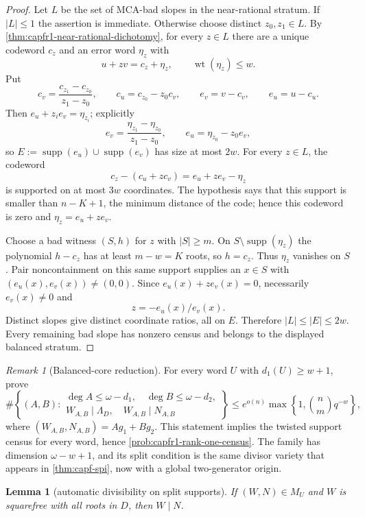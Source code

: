 \documentclass[11pt]{article}
\newtheorem{lemma}[lemma]{Lemma}
\theoremstyle{definition}
\theoremstyle{remark}
\newtheorem{remark}[remark]{Remark}
\providecommand{\wt}{\operatorname{wt}}
\begin{document}
\begin{proof}
Let $L$ be the set of MCA-bad slopes in the near-rational stratum.  If
$|L|\le1$ the assertion is immediate.  Otherwise choose distinct
$z_0,z_1\in L$.  By \cref{thm:capfr1-near-rational-dichotomy}, for every
$z\in L$ there are a unique codeword $c_z$ and an error word $\eta_z$ with
\[
        u+zv=c_z+\eta_z,
        \qquad \wt(\eta_z)\le w.
\]
Put
\[
 c_v=\frac{c_{z_1}-c_{z_0}}{z_1-z_0},\qquad
 c_u=c_{z_0}-z_0c_v,\qquad
 e_v=v-c_v,\qquad e_u=u-c_u.
\]
Then $e_u+z_ie_v=\eta_{z_i}$; explicitly
\[
 e_v=\frac{\eta_{z_1}-\eta_{z_0}}{z_1-z_0},\qquad
 e_u=\eta_{z_0}-z_0e_v,
\]
so $E:=\operatorname{supp}(e_u)\cup\operatorname{supp}(e_v)$ has size at most $2w$.  For every
$z\in L$, the codeword
\[
 c_z-(c_u+zc_v)=e_u+ze_v-\eta_z
\]
is supported on at most $3w$ coordinates.  The hypothesis says that this
support is smaller than $n-K+1$, the minimum distance of the code;
hence this codeword is zero and $\eta_z=e_u+ze_v$.

Choose a bad witness $(S,h)$ for $z$ with $|S|\ge m$.  On
$S\setminus\operatorname{supp}(\eta_z)$ the polynomial $h-c_z$ has at least
$m-w=K$ roots, so $h=c_z$.  Thus $\eta_z$ vanishes on $S$.  Pair
noncontainment on this same support supplies an $x\in S$ with
$(e_u(x),e_v(x))\ne(0,0)$.  Since
$e_u(x)+ze_v(x)=0$, necessarily $e_v(x)\ne0$ and
\[
        z=-e_u(x)/e_v(x).
\]
Distinct slopes give distinct coordinate ratios, all on $E$.  Therefore
$|L|\le|E|\le2w$.  Every remaining bad slope has nonzero census and belongs
to the displayed balanced stratum.
\end{proof}

\begin{remark}[Balanced-core reduction]\label{prob:capfr1-balanced-core}
For every word \(U\) with \(d_1(U)\ge w+1\), prove
\[
        \#\left\{(A,B):
\begin{array}{l}
\deg A\le\omega-d_1,\quad \deg B\le\omega-d_2,\\
W_{A,B}\mid\Lambda_D,\quad W_{A,B}\mid N_{A,B}
\end{array}
\right\}
\le e^{o(n)}\max\left\{1,\binom n m q^{-w}\right\},
\]
where \((W_{A,B},N_{A,B})=Ag_1+Bg_2\).  This statement implies the twisted support census for every word, hence \cref{prob:capfr1-rank-one-census}.  The family has dimension \(\omega-w+1\), and its split condition is the same divisor variety that appears in \cref{thm:capf-spi}, now with a global two-generator origin.
\end{remark}

\begin{lemma}[automatic divisibility on split supports]\label{lem:capfr1-autodiv}
If \((W,N)\in M_U\) and \(W\) is squarefree with all roots in \(D\), then \(W\mid N\).
\end{lemma}
\end{document}

